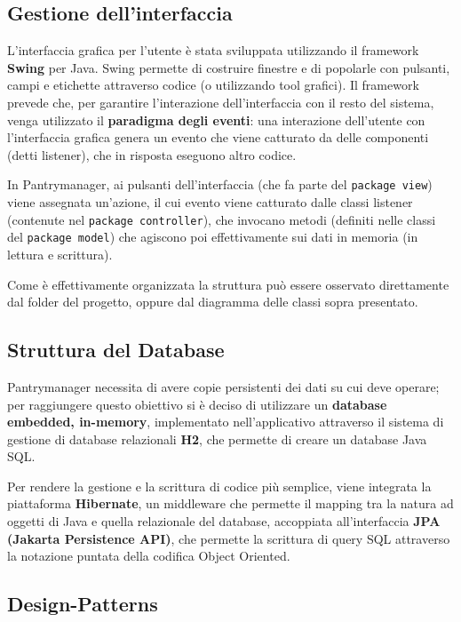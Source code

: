 \documentclass{article}
\begin{document}
\subsection{Gestione dell'interfaccia}
L'interfaccia grafica per l'utente è stata sviluppata utilizzando il framework \textbf{Swing} per Java. Swing permette di costruire finestre e di popolarle con pulsanti, campi e etichette attraverso codice (o utilizzando tool grafici). Il framework prevede che, per garantire l'interazione dell'interfaccia con il resto del sistema, venga utilizzato il \textbf{paradigma degli eventi}: una interazione dell'utente con l'interfaccia grafica genera un evento che viene catturato da delle componenti (detti listener), che in risposta eseguono altro codice. \newline 

In Pantrymanager, ai pulsanti dell'interfaccia (che fa parte del \texttt{package view}) viene assegnata un'azione, il cui evento viene catturato dalle classi listener (contenute nel \texttt{package controller}), che invocano metodi (definiti nelle classi del \texttt{package model}) che agiscono poi effettivamente sui dati in memoria (in lettura e scrittura). \newline 

Come è effettivamente organizzata la struttura può essere osservato direttamente dal folder del progetto, oppure dal diagramma delle classi sopra presentato. 

\subsection{Struttura del Database}
Pantrymanager necessita di avere copie persistenti dei dati su cui deve operare; per raggiungere questo obiettivo si è deciso di utilizzare un \textbf{database embedded, in-memory}, implementato nell'applicativo attraverso il sistema di gestione di database relazionali \textbf{H2}, che permette di creare un database Java SQL.

Per rendere la gestione e la scrittura di codice più semplice, viene integrata la piattaforma \textbf{Hibernate}, un middleware che permette il mapping tra la natura ad oggetti di Java e quella relazionale del database, accoppiata all'interfaccia \textbf{JPA (Jakarta Persistence API)}, che permette la scrittura di query SQL attraverso la notazione puntata della codifica Object Oriented. 

\subsection{Design-Patterns}
\end{document}
